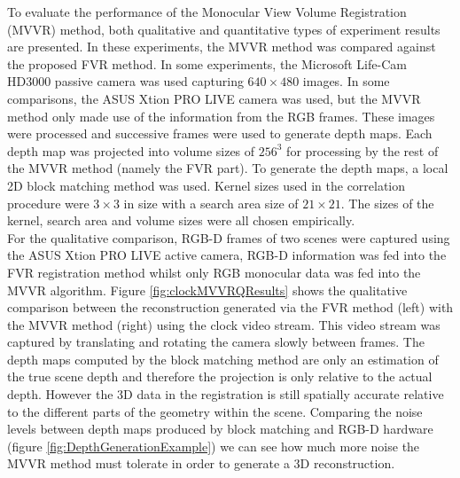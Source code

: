 To evaluate the performance of the Monocular View Volume Registration (MVVR) method, both qualitative and quantitative types of experiment results are presented. In these experiments, the MVVR method was compared against the proposed FVR method. In some experiments, the Microsoft Life-Cam HD3000 passive camera was used capturing $640 \times 480$ images. In some comparisons, the ASUS Xtion PRO LIVE camera was used, but the MVVR method only made use of the information from the RGB frames. These images were processed and successive frames were used to generate depth maps. Each depth map was projected into volume sizes of $256^3$ for processing by the rest of the MVVR method (namely the FVR part). To generate the depth maps, a local 2D block matching method was used. Kernel sizes used in the correlation procedure were $3 \times 3$ in size with a search area size of $21 \times 21$. The sizes of the kernel, search area and volume sizes were all chosen empirically. \\


For the qualitative comparison, RGB-D frames of two scenes were captured using the ASUS Xtion PRO LIVE active camera, RGB-D information was fed into the FVR registration method whilst only RGB monocular data was fed into the MVVR algorithm. Figure \ref{fig:clockMVVRQResults} shows the qualitative comparison between the reconstruction generated via the FVR method (left) with the MVVR method (right) using the clock video stream. This video stream was captured by translating and rotating the camera slowly between frames. The depth maps computed by the block matching method are only an estimation of the true scene depth and therefore the projection is only relative to the
actual depth. However the 3D data in the registration is still spatially accurate relative to the different parts of the geometry within the scene. Comparing the noise levels between depth maps produced by block matching and RGB-D hardware (figure \ref{fig:DepthGenerationExample}) we can see how much more noise the MVVR method must tolerate in order to generate a 3D reconstruction. \\


